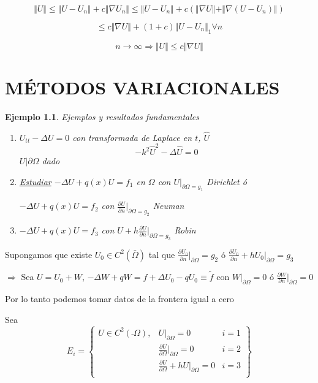 \documentclass[a4paper,10pt]{book}
\newtheorem{ejemplo}{Ejemplo}
\begin{document}
\[
\Vert U \Vert \leq \Vert U -U_n \Vert + c\Vert \nabla U_n \Vert \leq \Vert U-U_n\Vert + c ( \Vert \nabla U \Vert + \Vert \nabla ( U-U_n)  \Vert )
\]

\[
\leq c \Vert \nabla U \Vert + (1+c)\Vert U- U_n\Vert_1 \forall n
\]

\[
n\rightarrow\infty \Rightarrow \Vert U \Vert \leq c \Vert\nabla U \Vert
\]

\chapter{MÉTODOS VARIACIONALES}

\begin{ejemplo}
    Ejemplos y resultados fundamentales

    \begin{enumerate}
        \item $U_{tt} -\Delta U=0$ con transformada de Laplace en $t$, $\hat{U}$
        \[ -k^2 \hat{U}^2 -\Delta \hat{U}=0\]
        $U|{\partial \Omega}  $ dado 

     \item   \underline{Estudiar}  $-\Delta U + q(x) U = f_1 $  en $\Omega$ con $U|_{\partial \Omega =g_1} $ Dirichlet  ó 

  $-\Delta U + q(x) U = f_2 $ con $\frac{\partial U}{\partial n}|_{\partial \Omega =g_2} $ Neuman
   \item $-\Delta U + q(x) U = f_3 $ con $U+h\frac{\partial U}{\partial n}|_{\partial \Omega =g_3} $ Robin     
    \end{enumerate}
\end{ejemplo}

Supongamos que existe $U_0\in C^2 (\bar{\Omega})$ tal que $\frac{\partial U_0 }{ \partial n}|_{\partial \Omega} =g_2 $ ó 
$\frac{\partial U_0 }{ \partial n} + h U_0|_{\partial \Omega}  =g_3 $

$\Rightarrow$ Sea $U = U_0 +W $, $-\Delta W +qW= f+\Delta U_0 -q U_0 \equiv \tilde{f} $ con $W|_{\partial \Omega} =0 $ ó $\frac{\partial W}{\partial n}|_{\partial \Omega} =0 $  

Por lo tanto podemos tomar datos de la frontera igual a cero 

Sea 
\[
E_i = \left\{ \begin{array}{llr}
     U\in C^2 (\bar{}\Omega), & U|_{\partial \Omega} = 0 & i=1  \\
     &  \frac{\partial U}{\partial \Omega}|_{\partial \Omega} = 0 & i=2 \\
     & \frac{\partial U}{\partial \Omega} + hU |_{\partial \Omega} = 0 & i=3 \\
\end{array} 
\right\}
\]
\end{document}
